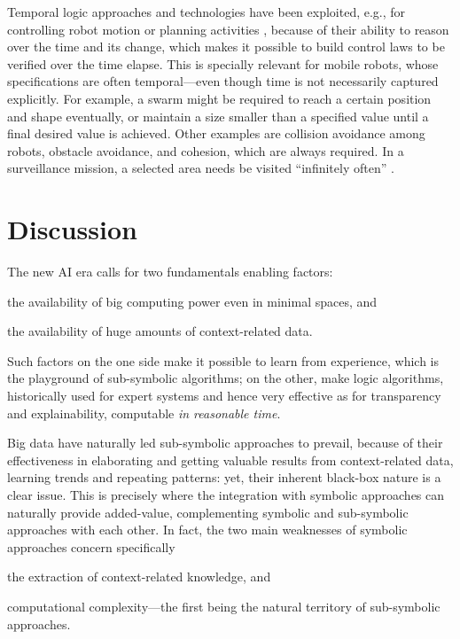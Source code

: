 \documentclass[12pt,a4paper,openright,twoside]{book}
\begin{document}
Temporal logic approaches and technologies have been exploited, e.g., for controlling robot motion or planning activities \cite{finucane2010,fainekos2009}, because of their ability to reason over the time and its change, which makes it possible to build control laws to be verified over the time elapse.
%
This is specially relevant for mobile robots, whose specifications are often temporal---even though time is not necessarily captured explicitly.
%
For example, a swarm might be required to reach a certain position and shape eventually, or maintain a size smaller than a specified value until a final desired value is achieved.
%
Other examples are collision avoidance among robots, obstacle avoidance, and cohesion, which are always required.
%
In a surveillance mission, a selected area needs be visited ``infinitely often'' \cite{Kloetzer2007}.

\section{Discussion}

The new AI era calls for two fundamentals enabling factors:
%
\begin{inlinelist}
    \item the availability of big computing power even in minimal spaces, and
    \item the availability of huge amounts of context-related data.
\end{inlinelist}
%
Such factors on the one side make it possible to learn from experience, which is the playground of  sub-symbolic algorithms; on the other, make logic algorithms, historically used for expert systems and hence very effective as for transparency and explainability, computable \emph{in reasonable time}.

Big data have naturally led sub-symbolic approaches to prevail, because of their effectiveness in elaborating and getting valuable results from context-related data, learning trends and repeating patterns: yet, their inherent black-box nature is a clear issue.
%
This is precisely where the integration with symbolic approaches can naturally provide added-value, complementing symbolic and sub-symbolic approaches with each other.
In fact, the two main weaknesses of symbolic approaches concern specifically
%
\begin{inlinelist}
    \item the extraction of context-related knowledge, and
    \item computational complexity---the first being the natural territory of sub-symbolic approaches.
\end{inlinelist}
\end{document}
